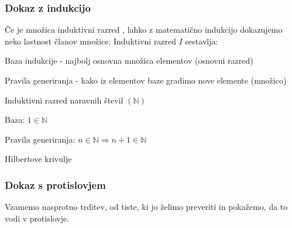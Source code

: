 \documentclass[10pt,a4paper,oneside]{book}
\begin{document}
\subsubsection{Dokaz z indukcijo}
Če je množica induktivni razred%
, lahko z matematično indukcijo dokazujemo neko lastnost članov množice. Induktivni razred $I$ sestavlja:
\begin{items}
\item Baza indukcije - najbolj osnovna množica elementov (osnovni razred)
\item Pravila generiranja - kako iz elementov baze gradimo nove elemente (množico)
\end{items}
\begin{primeri}
\item Induktivni razred naravnih števil $(\mathbb{N})$
	\begin{items}
	\item Baza: $1 \in \mathbb{N}$ 
	\item Pravila generiranja: $n \in \mathbb{N} \Longrightarrow n+1 \in \mathbb{N} $
	\end{items}
\item Hilbertove krivulje \fixme
\end{primeri}

\subsubsection{Dokaz s protislovjem}
Vzamemo nasprotno trditev, od tiste, ki jo želimo preveriti in pokažemo, da to vodi v protislovje.
\end{document}
